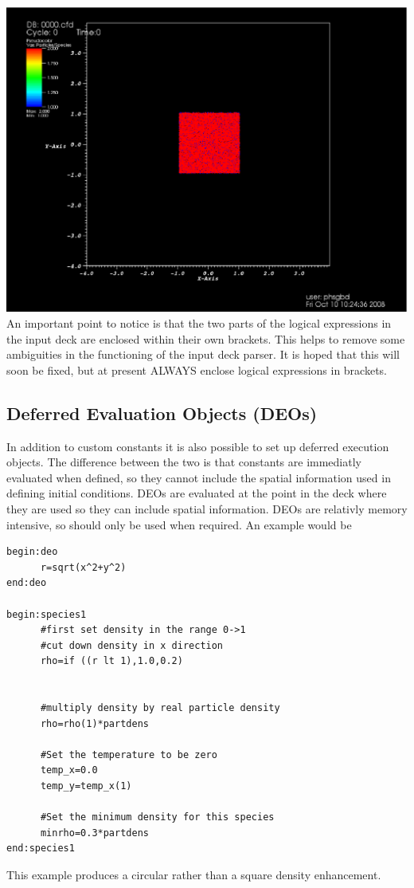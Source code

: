 \documentclass[12pt]{article}
\begin{document}
{\center \includegraphics{./images/example3.eps}\\}
An important point to notice is that the two parts of the logical expressions in the input deck are enclosed within their own brackets. This helps to remove some ambiguities in the functioning of the input deck parser. It is hoped that this will soon be fixed, but at present ALWAYS enclose logical expressions in brackets.
\subsection{Deferred Evaluation Objects (DEOs)}
In addition to custom constants it is also possible to set up deferred execution objects. The difference between the two is that constants are immediatly evaluated when defined, so they cannot include the spatial information used in defining initial conditions. DEOs are evaluated at the point in the deck where they are used so they can include spatial information. DEOs are relativly memory intensive, so should only be used when required. An example would be
\begin{verbatim}
begin:deo
      r=sqrt(x^2+y^2)
end:deo

begin:species1
      #first set density in the range 0->1
      #cut down density in x direction
      rho=if ((r lt 1),1.0,0.2)


      #multiply density by real particle density
      rho=rho(1)*partdens

      #Set the temperature to be zero
      temp_x=0.0
      temp_y=temp_x(1)

      #Set the minimum density for this species
      minrho=0.3*partdens
end:species1
\end{verbatim}
This example produces a circular rather than a square density enhancement.
\end{document}
